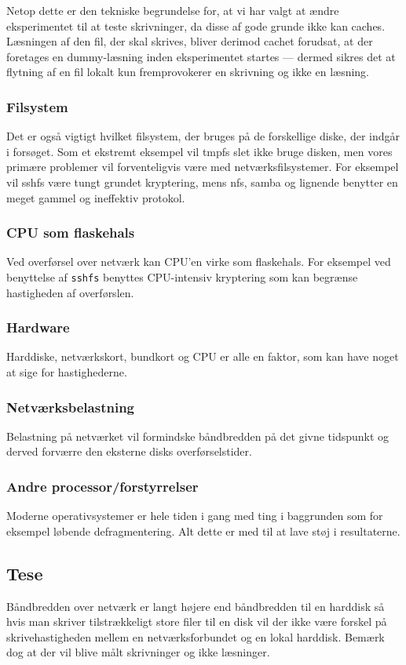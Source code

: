 \documentclass{article}
\begin{document}
Netop dette er den tekniske begrundelse for, at vi har valgt at ændre eksperimentet til at teste skrivninger, da disse af gode grunde ikke kan caches. Læsningen af den fil, der skal skrives, bliver derimod cachet forudsat, at der foretages en dummy-læsning inden eksperimentet startes --- dermed sikres det at flytning af en fil lokalt kun fremprovokerer en skrivning og ikke en læsning.

\subsubsection{Filsystem}
Det er også vigtigt hvilket filsystem, der bruges på de forskellige diske, der indgår i forsøget. Som et ekstremt eksempel vil tmpfs slet ikke bruge disken, men vores primære problemer vil forventeligvis være med netværksfilsystemer. For eksempel vil sshfs være tungt grundet kryptering, mens nfs, samba og lignende benytter en meget gammel og ineffektiv protokol.

\subsubsection{CPU som flaskehals}
Ved overførsel over netværk kan CPU'en virke som flaskehals. For eksempel ved benyttelse af {\tt sshfs} benyttes CPU-intensiv kryptering som kan begrænse hastigheden af overførslen.

\subsubsection{Hardware}
Harddiske, netværkskort, bundkort og CPU er alle en faktor, som kan have noget at sige for hastighederne.

\subsubsection{Netværksbelastning}
Belastning på netværket vil formindske båndbredden på det givne tidspunkt og derved forværre den eksterne disks overførselstider.

\subsubsection{Andre processor/forstyrrelser}
Moderne operativsystemer er hele tiden i gang med ting i baggrunden som for eksempel løbende defragmentering. Alt dette er med til at lave støj i resultaterne.

\subsection{Tese}
Båndbredden over netværk er langt højere end båndbredden til en harddisk så hvis man skriver tilstrækkeligt store filer til en disk vil der ikke være forskel på skrivehastigheden mellem en netværksforbundet og en lokal harddisk. Bemærk dog at der vil blive målt skrivninger og ikke læsninger.
\end{document}
